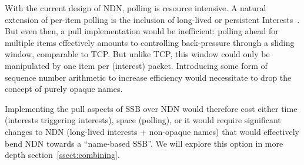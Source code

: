 \documentclass[9pt,sigconf]{acmart}
\begin{document}
With the current design of NDN, polling is resource intensive. A natural extension of per-item polling is the inclusion of long-lived or persistent Interests~\cite{moll2018persistent}. But even then, a pull implementation would be inefficient: polling ahead for multiple items effectively amounts to controlling back-pressure through a sliding window, comparable to TCP. But unlike TCP, this window could only be manipulated by one item per (interest) packet. Introducing some form of sequence number arithmetic to increase efficiency would necessitate to drop the concept of purely opaque names.

Implementing the pull aspects of SSB over NDN would therefore cost either time (interests triggering interests), space (polling), or it would require significant changes to NDN (long-lived interests + non-opaque names) that would effectively bend NDN towards a ``name-based SSB''. We will explore this option in more depth section~\ref{ssect:combining}.
\end{document}
